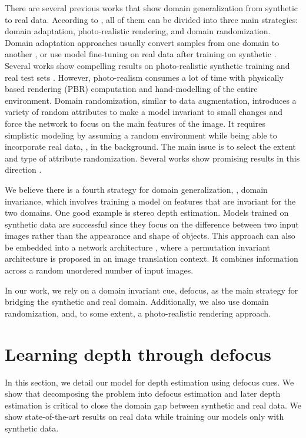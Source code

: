 \documentclass[10pt,twocolumn,letterpaper]{article}
\begin{document}
There are several previous works that show domain generalization from synthetic to real data. According to \cite{Sundermeyer18}, all of them can be divided into three main strategies: domain adaptation, photo-realistic rendering, and domain randomization. 
Domain adaptation approaches usually convert samples from one domain to another \cite{DBLP:conf/cvpr/ShrivastavaPTSW17, DBLP:conf/cvpr/ZhaoFGT19}, or use model fine-tuning on real data after training on synthetic \cite{DBLP:conf/eccv/GuoLYRW18}. 
Several works show compelling results on photo-realistic synthetic training and real test sets \cite{Li18, Material_Li18}. However, photo-realism consumes a lot of time with physically based rendering (PBR) computation and hand-modelling of the entire environment.
Domain randomization, similar to data augmentation, introduces a variety of random attributes to make a model invariant to small changes and force the network to focus on the main features of the image. 
It requires simplistic modeling by assuming a random environment while being able to incorporate real data, \eg, in the background.
The main issue is to select the extent and type of attribute randomization. Several works show promising results in this direction \cite{Sundermeyer18, Aittala18}. 

We believe there is a fourth strategy for domain generalization, \ie, domain invariance, which involves training a model on features that are invariant for the two domains. 
One good example is stereo depth estimation. Models trained on synthetic data \cite{Guo18} are successful since they focus on the difference between two input images rather than the appearance and shape of objects.
This approach can also be embedded into a network architecture \cite{Aittala18}, where a permutation invariant architecture is proposed in an image translation context. It combines information across a random unordered number of input images. 


In our work, we rely on a domain invariant cue, defocus, as the main strategy for bridging the synthetic and real domain. Additionally, we also use domain randomization, and, to some extent, a photo-realistic rendering approach. 




\section{Learning depth through defocus}


In this section, we detail our model for depth estimation using defocus cues. We show that decomposing the problem into defocus estimation and later depth estimation is critical to close the domain gap between synthetic and real data. We show state-of-the-art results on real data while training our models only with synthetic data.
\end{document}
